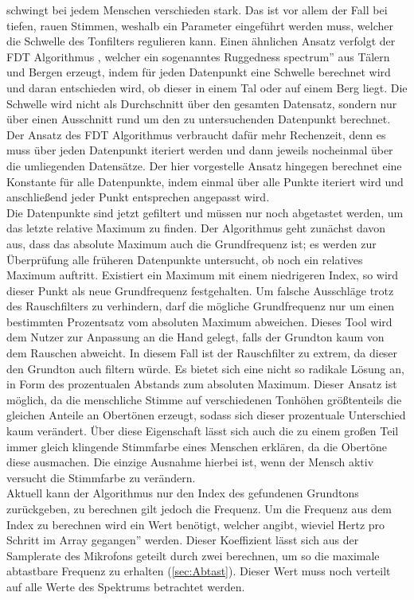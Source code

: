 schwingt bei jedem Menschen verschieden stark. Das ist vor allem der Fall bei tiefen, rauen Stimmen, weshalb ein Parameter 
eingeführt werden muss, welcher die Schwelle des Tonfilters regulieren kann. Einen ähnlichen Ansatz verfolgt der FDT Algorithmus \cite{yazama2005simple}, welcher ein sogenanntes \glqq Ruggedness spectrum'' aus Tälern und Bergen erzeugt, indem für jeden Datenpunkt eine Schwelle berechnet wird und daran entschieden wird, ob dieser in einem Tal oder auf einem Berg liegt. Die Schwelle wird nicht als Durchschnitt über den gesamten Datensatz, sondern nur über einen Ausschnitt rund um den zu untersuchenden Datenpunkt berechnet. Der Ansatz des FDT Algorithmus verbraucht dafür mehr Rechenzeit, denn es muss über jeden Datenpunkt iteriert werden und dann jeweils nocheinmal über die umliegenden Datensätze. Der hier vorgestelle Ansatz hingegen berechnet eine Konstante für alle Datenpunkte, indem einmal über alle Punkte iteriert wird und anschließend jeder Punkt entsprechen angepasst wird. \\
Die Datenpunkte sind jetzt gefiltert und müssen nur noch abgetastet werden, um das letzte relative Maximum zu finden. Der Algorithmus geht zunächst davon aus, dass das absolute Maximum auch die Grundfrequenz ist; es werden zur Überprüfung alle früheren Datenpunkte untersucht, ob noch ein relatives Maximum auftritt. Existiert ein Maximum mit einem niedrigeren Index, so wird dieser Punkt als neue Grundfrequenz festgehalten. Um falsche Ausschläge trotz des Rauschfilters zu verhindern, darf die mögliche Grundfrequenz nur um einen bestimmten Prozentsatz vom absoluten Maximum abweichen. Dieses Tool wird dem Nutzer zur Anpassung an die Hand gelegt, falls der Grundton kaum von dem Rauschen abweicht. In diesem Fall ist der Rauschfilter zu extrem, da dieser den Grundton auch filtern würde. Es bietet sich eine nicht so radikale Lösung an, in Form des prozentualen Abstands zum absoluten Maximum. Dieser Ansatz ist möglich, da die menschliche Stimme auf verschiedenen Tonhöhen größtenteils die gleichen Anteile an Obertönen erzeugt, sodass sich dieser prozentuale Unterschied kaum verändert. Über diese Eigenschaft lässt sich auch die zu einem großen Teil immer gleich klingende Stimmfarbe eines Menschen erklären, da die Obertöne diese ausmachen. Die einzige Ausnahme hierbei ist, wenn der Mensch aktiv versucht die Stimmfarbe zu verändern. \\
Aktuell kann der Algorithmus nur den Index des gefundenen Grundtons zurückgeben, zu berechnen gilt jedoch die Frequenz. Um die Frequenz aus dem Index zu berechnen wird ein Wert benötigt, welcher angibt, wieviel Hertz pro Schritt im Array \glqq gegangen'' werden. Dieser Koeffizient lässt sich aus der Samplerate des Mikrofons geteilt durch zwei berechnen, um so die maximale abtastbare Frequenz zu erhalten (\ref{sec:Abtast}). Dieser Wert muss noch verteilt auf alle Werte des Spektrums betrachtet werden.
